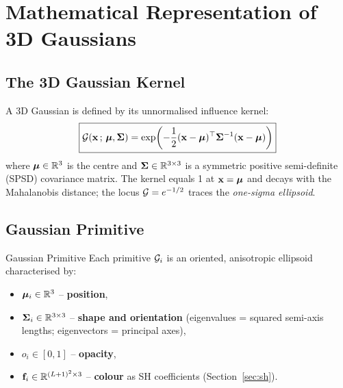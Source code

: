 \newpage
\section{Mathematical Representation of 3D Gaussians}
\label{sec:gaussian_repr}

\subsection{The 3D Gaussian Kernel}

A 3D Gaussian is defined by its unnormalised influence kernel:
\begin{equation}
  \boxed{
    \mathcal{G}(\mathbf{x}\,;\,\boldsymbol{\mu},\boldsymbol{\Sigma})
    = \exp\!\left(-\frac{1}{2}(\mathbf{x}-\boldsymbol{\mu})^\top \boldsymbol{\Sigma}^{-1} (\mathbf{x}-\boldsymbol{\mu})\right)
  }
  \label{eq:gaussian_kernel}
\end{equation}
where $\boldsymbol{\mu} \in \mathbb{R}^3$ is the centre and $\boldsymbol{\Sigma} \in \mathbb{R}^{3\times 3}$ is a
symmetric positive semi-definite (SPSD) covariance matrix. The kernel equals 1
at $\mathbf{x}=\boldsymbol{\mu}$ and decays with the Mahalanobis distance; the locus
$\mathcal{G} = e^{-1/2}$ traces the \emph{one-sigma ellipsoid}.

\subsection{Gaussian Primitive}

\begin{definitionbox}{Gaussian Primitive}
Each primitive $\mathcal{G}_i$ is an oriented, anisotropic ellipsoid characterised by:
\begin{itemize}
  \item $\boldsymbol{\mu}_i \in \mathbb{R}^3$ -- \textbf{position},
  \item $\boldsymbol{\Sigma}_i \in \mathbb{R}^{3\times 3}$ -- \textbf{shape and orientation}
        (eigenvalues = squared semi-axis lengths; eigenvectors = principal axes),
  \item $o_i \in [0,1]$ -- \textbf{opacity},
  \item $\mathbf{f}_i \in \mathbb{R}^{(L+1)^2 \times 3}$ -- \textbf{colour} as SH
        coefficients (Section~\ref{sec:sh}).
\end{itemize}
\end{definitionbox}


